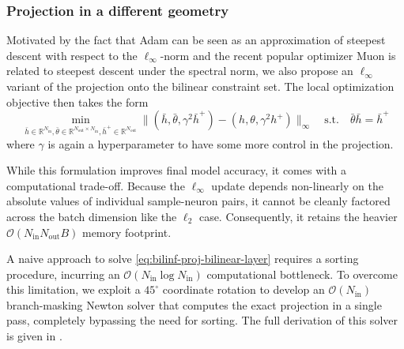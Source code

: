 \documentclass{article}
\let\cref\crtcref
\begin{document}
\subsubsection{Projection in a different geometry}
Motivated by the fact that Adam \cite{kingma2014adam} can be seen as an approximation of steepest descent with respect to the $\ell_\infty$-norm  \cite{xie2024implicit} and the recent popular optimizer Muon \cite{jordan2024muon} is related to steepest descent under the spectral norm, we also propose an $\ell_\infty$ variant of the projection onto the bilinear constraint set. The local optimization objective then takes the form
\begin{equation}
\label{eq:bilinf-proj-bilinear-layer}
\min_{\bar{h} \in \mathbb{R}^{N_{\mathrm{in}}}, \bar{\theta} \in \mathbb{R}^{N_{\mathrm{out}} \times N_{\mathrm{in}}}, \bar{h}^+ \in \mathbb{R}^{N_{\mathrm{out}}}} \| (\bar{h}, \bar{\theta}, \gamma^2 \bar{h}^+) - (h, \theta, \gamma^2 h^+) \|_\infty \quad \text{s.t.} \quad \bar{\theta} \bar{h} = \bar{h}^+
\end{equation}
where $\gamma$ is again a hyperparameter to have some more control in the projection.

While this formulation improves final model accuracy, it comes with a computational trade-off. Because the $\ell_\infty$ update depends non-linearly on the absolute values of individual sample-neuron pairs, it cannot be cleanly factored across the batch dimension like the $\ell_2$ case. Consequently, it retains the heavier $\mathcal{O}(N_{\mathrm{in}}N_{\mathrm{out}}B)$ memory footprint.%

A naive approach to solve \eqref{eq:bilinf-proj-bilinear-layer} requires a sorting procedure, incurring an $\mathcal{O}(N_{\mathrm{in}} \log N_{\mathrm{in}})$ computational bottleneck. To overcome this limitation, we exploit a $45^\circ$ coordinate rotation to develop an $\mathcal{O}(N_{\mathrm{in}})$ branch-masking Newton solver that computes the exact projection in a single pass, completely bypassing the need for sorting. The full derivation of this solver is given in \cref{sec:linf}.
\end{document}

